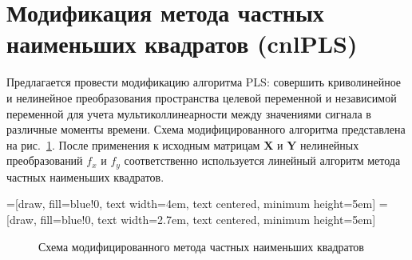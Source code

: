 \documentclass[12pt,twoside]{article}
\newcommand{\bw}{\mathbf{w}}
\newcommand{\bY}{\mathbf{Y}}
\newcommand{\bX}{\mathbf{X}}
\newcommand{\bu}{\mathbf{u}}
\newcommand{\bt}{\mathbf{t}}
\newcommand{\bp}{\mathbf{p}}
\newcommand{\bq}{\mathbf{q}}
\newcommand{\bv}{\mathbf{v}}
\newcommand{\bc}{\mathbf{c}}
\newcommand{\bP}{\mathbf{P}}
\newcommand{\bT}{\mathbf{T}}
\newcommand{\bQ}{\mathbf{Q}}
\newcommand{\bE}{\mathbf{E}}
\newcommand{\bF}{\mathbf{F}}
\newcommand{\bU}{\mathbf{U}}
\newcommand{\bD}{\mathbf{D}}
\begin{document}

\newpage
\section{Модификация метода частных наименьших квадратов (cnlPLS)}
Предлагается провести модификацию алгоритма PLS: совершить криволинейное и нелинейное преобразования пространства целевой переменной  и независимой переменной для учета мультиколлинеарности между значениями сигнала в различные моменты времени. Схема модифицированного алгоритма представлена на рис.~\ref{scheme_cnlPLS}. 
После применения к исходным матрицам $\bX$ и $\bY$ нелинейных преобразований $f_x$ и $f_y$ соответственно используется линейный алгоритм метода частных наименьших квадратов.


=[draw, fill=blue!0, text width=4em, 
    text centered, minimum height=5em]
=[draw, fill=blue!0, text width=2.7em, 
    text centered, minimum height=5em]
\begin{figure}[H]
\centering
{\footnotesize
\def\blockdist{2.3}
\def\edgedist{2.5}
\vspace{1cm}
\hspace{1cm}
}
\caption{Схема модифицированного метода частных наименьших квадратов}
\label{scheme_cnlPLS}
\end{figure}
\end{document}
